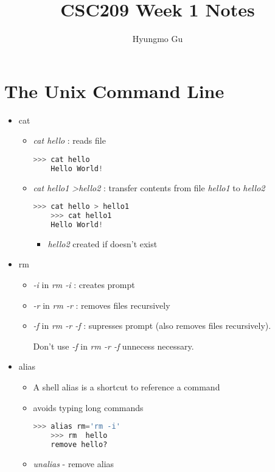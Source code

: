 \documentclass[12pt]{article}
\begin{document}
\title{CSC209 Week 1 Notes}
\author{Hyungmo Gu}
\maketitle

\section*{The Unix Command Line}
\begin{itemize}
\item cat
\begin{itemize}
    \item \textit{cat hello} : reads file

    \begin{lstlisting}[language=Python]
    >>> cat hello
    Hello World!
    \end{lstlisting}
    \item \textit{cat hello1 \textgreater\:hello2} : transfer contents from file \textit{hello1} to \textit{hello2}

    \begin{lstlisting}[language=Python]
    >>> cat hello > hello1
    >>> cat hello1
    Hello World!
    \end{lstlisting}

    \begin{itemize}
        \item \textit{hello2} created if doesn't exist
    \end{itemize}
\end{itemize}
\item rm
\begin{itemize}
    \item \textit{-i} in \textit{rm -i} : creates prompt
    \item \textit{-r} in \textit{rm -r} : removes files recursively
    \item \textit{-f} in \textit{rm -r -f} : supresses prompt (also removes files recursively).

    \bigskip

    Don't use \textit{-f} in \textit{rm -r -f} unnecess necessary.
\end{itemize}
\item alias
\begin{itemize}
    \item A shell alias is a shortcut to reference a command
    \item avoids typing long commands
    \begin{lstlisting}[language=Python]
    >>> alias rm='rm -i'
    >>> rm  hello
    remove hello?
    \end{lstlisting}
    \item \textit{unalias} - remove alias
\end{itemize}
\end{itemize}
\end{document}

